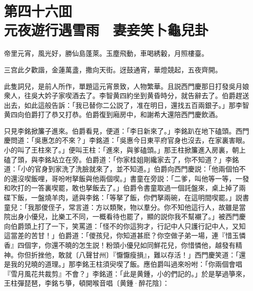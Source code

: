 
\chapter*{第四十六囬　\\元夜遊行遇雪雨　妻妾笑卜龜兒卦}


\begin{myquote}
帝里元宵，風光好，勝仙島蓬萊。玉塵飛動，車喝綉轂，月照樓臺。

三宫此夕歡諧，金蓮萬盞，撒向天街。迓鼓通宵，華燈競起，五夜齊開。
\end{myquote}

此隻詞兒，是前人所作，單題這元宵景致，人物繁華。且説西門慶那日打發吳月娘衆人，往吳大妗子家喫酒去了。李智黄四約坐到黄昏時分，就告辭去了。伯爵趕送出去，如此這般告訴：「我已替你二公説了，准在明日，還找五百兩銀子。」那李智黄四向伯爵打了恭又打恭。伯爵復到廂房中，和謝希大還陪西門慶飲酒。

只見李銘掀簾子進來。伯爵看見，便道：「李日新來了。」李銘趴在地下磕頭。西門慶問道：「吳惠怎的不來？」李銘道：「吳惠今日東平府官身也沒去，在家裏害眼。小的叫了王柱來了。」便叫王柱：「進來，與爹磕頭。」那王柱掀簾進入房裏，朝上磕了頭，與李銘站立在旁。伯爵道：「你家桂姐剛纔家去了，你不知道？」李銘道：「小的官身到家洗了洗臉就來了，並不知道。」伯爵向西門慶説：「他兩個怕不的還沒喫飯哩，哥吩咐拏飯與他兩個喫。」書童在旁説：「二爹，叫他等一等，一發和吹打的一答裏喫罷，敢也拏飯去了。」伯爵令書童取過一個託盤來，桌上掉了兩碟下飯，一盤燒羊肉，遞與李銘：「等拏了飯，你們拏兩碗，在這明間喫罷。」説書童兒：「我那儍侄子，常言道：方以類聚，物以羣分。你不知他這行人，故雖是當院出身小優兒，比樂工不同，一概看待也罷了，顯的説你我不幫襯了。」被西門慶向伯爵頭上打了一下，笑罵道：「怪不的你這狗才，行記中人只護行記中人，又知這當差的苦甘！」伯爵道：「儍孩兒，你知道甚麽？你空做子弟一場，連『惜玉憐香』四個字，你還不曉的怎生説！粉頭小優兒如同鮮花兒，你惜憐他，越發有精神。你但折挫他，敢就〔八聲甘州〕『懨懨瘦損』，難以存活！」西門慶笑道：「還是我的兒曉的道理。」那李銘王柱須臾喫了飯。應伯爵叫過來吩咐：「你兩個會唱『雪月風花共裁剪』不會？」李銘道：「此是黄鍾，小的們記的。」於是拏過箏來，王柱彈琵琶，李銘ち箏，頓開喉音唱〔黄鍾·醉花陰〕：

